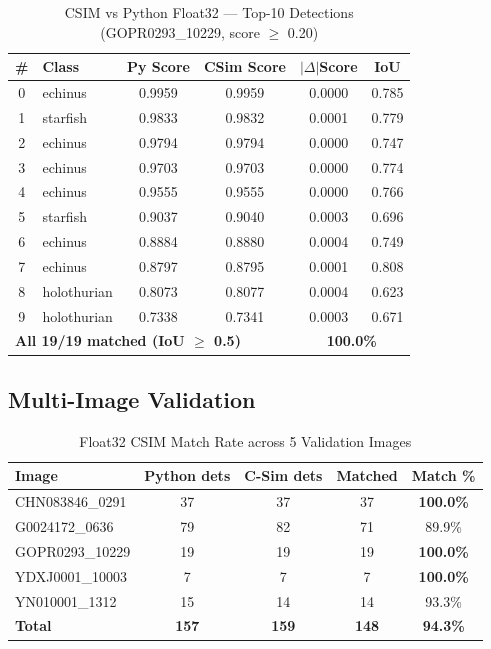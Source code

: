 \begin{table}[H]
\centering
\caption{CSIM vs Python Float32 — Top-10 Detections (GOPR0293\_10229, score $\geq$ 0.20)}
\renewcommand{\arraystretch}{1.1}
\begin{tabularx}{\textwidth}{|c|l|c|c|c|c|}
\hline
\textbf{\#} & \textbf{Class} & \textbf{Py Score} & \textbf{CSim Score} & \textbf{$|\Delta|$Score} & \textbf{IoU} \\
\hline
0  & echinus      & 0.9959 & 0.9959 & 0.0000 & 0.785 \\
1  & starfish     & 0.9833 & 0.9832 & 0.0001 & 0.779 \\
2  & echinus      & 0.9794 & 0.9794 & 0.0000 & 0.747 \\
3  & echinus      & 0.9703 & 0.9703 & 0.0000 & 0.774 \\
4  & echinus      & 0.9555 & 0.9555 & 0.0000 & 0.766 \\
5  & starfish     & 0.9037 & 0.9040 & 0.0003 & 0.696 \\
6  & echinus      & 0.8884 & 0.8880 & 0.0004 & 0.749 \\
7  & echinus      & 0.8797 & 0.8795 & 0.0001 & 0.808 \\
8  & holothurian  & 0.8073 & 0.8077 & 0.0004 & 0.623 \\
9  & holothurian  & 0.7338 & 0.7341 & 0.0003 & 0.671 \\
\hline
\multicolumn{4}{|l|}{\textbf{All 19/19 matched (IoU $\geq$ 0.5)}} & \multicolumn{2}{c|}{\textbf{100.0\%}} \\
\hline
\end{tabularx}
\label{table:csim_results}
\end{table}

\subsection{Multi-Image Validation}

\begin{table}[H]
\centering
\caption{Float32 CSIM Match Rate across 5 Validation Images}
\begin{tabular}{|l|c|c|c|c|}
\hline
\textbf{Image} & \textbf{Python dets} & \textbf{C-Sim dets} & \textbf{Matched} & \textbf{Match \%} \\
\hline
CHN083846\_0291  & 37  & 37  & 37  & \textbf{100.0\%} \\
G0024172\_0636   & 79  & 82  & 71  & 89.9\% \\
GOPR0293\_10229  & 19  & 19  & 19  & \textbf{100.0\%} \\
YDXJ0001\_10003  & 7   & 7   & 7   & \textbf{100.0\%} \\
YN010001\_1312   & 15  & 14  & 14  & 93.3\% \\
\hline
\textbf{Total}   & \textbf{157} & \textbf{159} & \textbf{148} & \textbf{94.3\%} \\
\hline
\end{tabular}
\label{table:multi_image_results}
\end{table}

